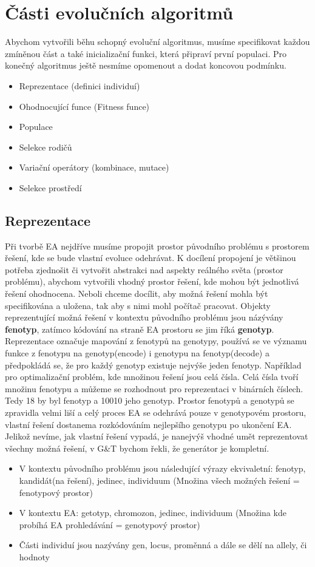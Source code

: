 \section{Části evolučních algoritmů}
Abychom vytvořili běhu schopný evoluční algoritmus, musíme specifikovat každou zmíněnou část a také inicializační funkci, která připraví první populaci. Pro konečný algoritmus ještě nesmíme opomenout a dodat koncovou podmínku. 
\begin{itemize}
\item{Reprezentace (definici individuí)}
\item{Ohodnocující funce (Fitness funce)}
\item{Populace}
\item{Selekce rodičů}
\item{Variační operátory (kombinace, mutace)}
\item{Selekce prostředí}
\end{itemize}
\subsection{Reprezentace}
Při tvorbě EA nejdříve musíme propojit prostor původního problému s prostorem řešení, kde se bude vlastní evoluce odehrávat. K docílení propojení je většinou potřeba zjednošit či vytvořit abstrakci nad aspekty reálného světa (prostor problému), abychom vytvořili vhodný prostor řešení, kde mohou být jednotlivá řešení ohodnocena. Neboli chceme docílit, aby možná řešení mohla být specifikována a uložena, tak aby s nimi mohl počítač pracovat. Objekty reprezentující možná řešení v kontextu původního problému jsou názývány \textbf{fenotyp}, zatímco kódování na straně EA prostoru se jim říká \textbf{genotyp}. Reprezentace označuje mapování z fenotypů na genotypy, používá se ve významu funkce z fenotypu na genotyp(encode) i genotypu na fenotyp(decode) a předpokládá se, že pro každý genotyp existuje nejvýše jeden fenotyp. Například pro optimalizační problém, kde množinou řešení jsou celá čísla. Celá čísla tvoří množinu fenotypu a můžeme se rozhodnout pro reprezentaci v binárních číslech. Tedy 18 by byl fenotyp a 10010 jeho genotyp. Prostor fenotypů a genotypů se zpravidla velmi liší a celý proces EA se odehrává pouze v genotypovém prostoru, vlastní řešení dostanema rozkódováním nejlepšího genotypu po ukončení EA. Jelikož nevíme, jak vlastní řešení vypadá, je nanejvýš vhodné umět reprezentovat všechny možná řešení, v G\&T bychom řekli, že generátor je kompletní.
\begin{itemize}   
  \item V kontextu původního problému jsou následující výrazy ekvivaletní: fenotyp, kandidát(na řešení), jedinec, individuum (Množina všech možných řešení = fenotypový prostor)
  \item V kontextu EA: getotyp, chromozon, jedinec, individuum (Množina kde probíhá EA prohledávání = genotypový prostor)
  \item Části individuí jsou nazývány gen, locus, proměnná a dále se dělí na allely, či hodnoty
  \end{itemize}
